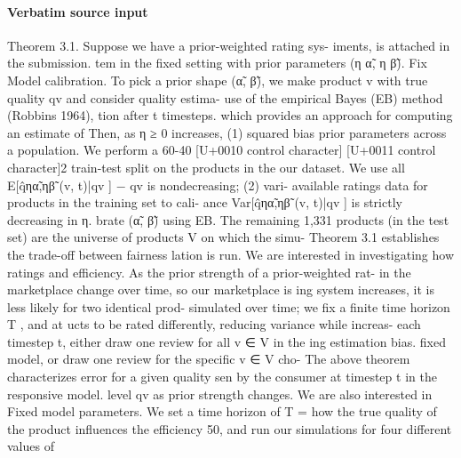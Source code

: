 \documentclass[10pt]{article}
\begin{document}
\paragraph{Verbatim source input}
\begin{ReviewVerbatim}
Theorem 3.1. Suppose we have a prior-weighted rating sys-                      iments, is attached in the submission.
tem in the fixed setting with prior parameters (η α̃, η β̃). Fix                  Model calibration. To pick a prior shape (α̃, β̃), we make
product v with true quality qv and consider quality estima-                    use of the empirical Bayes (EB) method (Robbins 1964),
tion after t timesteps.                                                        which provides an approach for computing an estimate of
   Then, as η             ≥ 0 increases, (1) squared bias                      prior parameters across a population. We perform a 60-40
[U+0010 control character]                              [U+0011 control character]2                                              train-test split on the products in the our dataset. We use all
  E[q̂ηα̃,ηβ̃ (v, t)|qv ] − qv     is nondecreasing; (2) vari-                 available ratings data for products in the training set to cali-
ance Var[q̂ηα̃,ηβ̃ (v, t)|qv ] is strictly decreasing in η.                    brate (α̃, β̃) using EB. The remaining 1,331 products (in the
                                                                               test set) are the universe of products V on which the simu-
   Theorem 3.1 establishes the trade-off between fairness                      lation is run. We are interested in investigating how ratings
and efficiency. As the prior strength of a prior-weighted rat-                 in the marketplace change over time, so our marketplace is
ing system increases, it is less likely for two identical prod-                simulated over time; we fix a finite time horizon T , and at
ucts to be rated differently, reducing variance while increas-                 each timestep t, either draw one review for all v ∈ V in the
ing estimation bias.                                                           fixed model, or draw one review for the specific v ∈ V cho-
   The above theorem characterizes error for a given quality                   sen by the consumer at timestep t in the responsive model.
level qv as prior strength changes. We are also interested in                     Fixed model parameters. We set a time horizon of T =
how the true quality of the product influences the efficiency                  50, and run our simulations for four different values of

\end{ReviewVerbatim}
\end{document}
